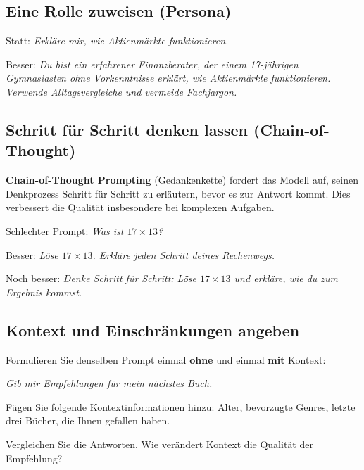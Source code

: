\subsection{Eine Rolle zuweisen (Persona)}

\begin{myexample}
Statt: \textit{Erkläre mir, wie Aktienmärkte funktionieren.}

Besser: \textit{Du bist ein erfahrener Finanzberater, der einem 17-jährigen
Gymnasiasten ohne Vorkenntnisse erklärt, wie Aktienmärkte funktionieren.
Verwende Alltagsvergleiche und vermeide Fachjargon.}
\end{myexample}

\subsection{Schritt für Schritt denken lassen (Chain-of-Thought)}

\begin{mydefinition}
\textbf{Chain-of-Thought Prompting} (Gedankenkette) fordert das Modell auf,
seinen Denkprozess Schritt für Schritt zu erläutern, bevor es zur Antwort kommt.
Dies verbessert die Qualität insbesondere bei komplexen Aufgaben.
\end{mydefinition}

\begin{myexample}
Schlechter Prompt: \textit{Was ist $17 \times 13$?}

Besser: \textit{Löse $17 \times 13$. Erkläre jeden Schritt deines Rechenwegs.}

Noch besser: \textit{Denke Schritt für Schritt: Löse $17 \times 13$ und
erkläre, wie du zum Ergebnis kommst.}
\end{myexample}

\subsection{Kontext und Einschränkungen angeben}

\begin{myexercise}
Formulieren Sie denselben Prompt einmal \textbf{ohne} und einmal
\textbf{mit} Kontext:

\textit{Gib mir Empfehlungen für mein nächstes Buch.}

Fügen Sie folgende Kontextinformationen hinzu: Alter, bevorzugte Genres,
letzte drei Bücher, die Ihnen gefallen haben.

Vergleichen Sie die Antworten. Wie verändert Kontext die Qualität der Empfehlung?
\end{myexercise}

